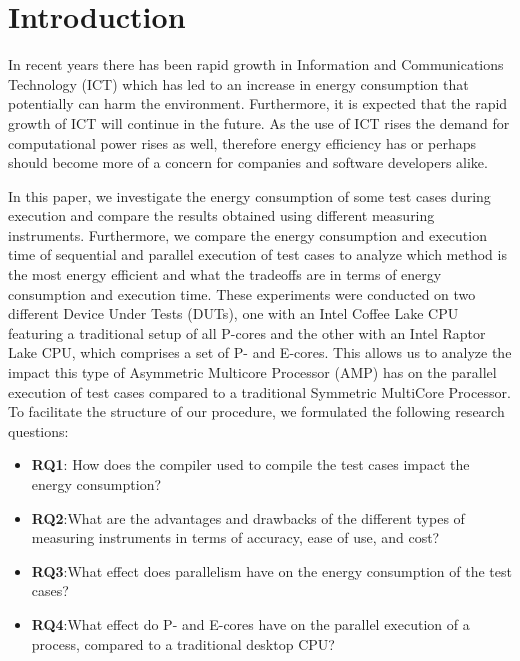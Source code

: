 \section{Introduction}

In recent years there has been rapid growth in Information and Communications Technology (ICT) which has led to an increase in energy consumption that potentially can harm the environment. Furthermore, it is expected that the rapid growth of ICT will continue in the future. \cite{jones2018stop,andrae2015global} As the use of ICT rises the demand for computational power rises as well, therefore energy efficiency has or perhaps should become more of a concern for companies and software developers alike.

In this paper, we investigate the energy consumption of some test cases during execution and compare the results obtained using different measuring instruments. Furthermore, we compare the energy consumption and execution time of sequential and parallel execution of test cases to analyze which method is the most energy efficient and what the tradeoffs are in terms of energy consumption and execution time. These experiments were conducted on two different Device Under Tests (DUTs), one with an Intel Coffee Lake CPU featuring a traditional setup of all P-cores and the other with an Intel Raptor Lake CPU, which comprises a set of P- and E-cores. This allows us to analyze the impact this type of Asymmetric Multicore Processor (AMP) has on the parallel execution of test cases compared to a traditional Symmetric MultiCore Processor. To facilitate the structure of our procedure, we formulated the following research questions:

\begin{itemize}
    \item \textbf{RQ1}: How does the compiler used to compile the test cases impact the energy consumption?
    \item \textbf{RQ2}:What are the advantages and drawbacks of the different types of measuring instruments in terms of accuracy, ease of use, and cost?
    \item \textbf{RQ3}:What effect does parallelism have on the energy consumption of the test cases?
    \item \textbf{RQ4}:What effect do P- and E-cores have on the parallel execution of a process, compared to a traditional desktop CPU?
\end{itemize}

